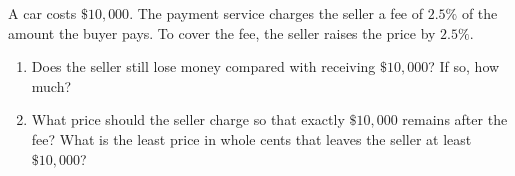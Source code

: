 A car costs $\$10{,}000$. The payment service charges the seller a fee of $2.5\%$ of the amount the buyer pays. To cover the fee, the seller raises the price by $2.5\%$.
\begin{enumerate}
\item[(a)] Does the seller still lose money compared with receiving $\$10{,}000$? If so, how much?
\item[(b)] What price should the seller charge so that exactly $\$10{,}000$ remains after the fee? What is the least price in whole cents that leaves the seller at least $\$10{,}000$?
\end{enumerate}
